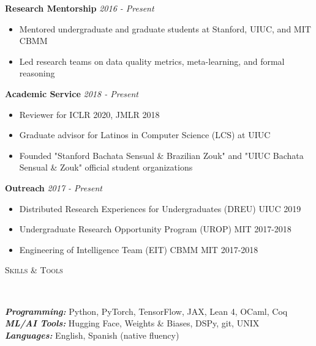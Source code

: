 \documentclass{article}
\newenvironment{changemargin}[2]{%
  \begin{list}{}{%
    \setlength{\topsep}{0pt}%
    \setlength{\leftmargin}{#1}%
    \setlength{\rightmargin}{#2}%
    \setlength{\listparindent}{\parindent}%
    \setlength{\itemindent}{\parindent}%
    \setlength{\parsep}{\parskip}%
  }%
  \item[]}{\end{list}
}
\newcommand{\lineover}{
	\begin{changemargin}{-0.05in}{-0.05in}
		\vspace*{-8pt}
		\hrulefill \\
		\vspace*{-2pt}
	\end{changemargin}
}
\newcommand{\header}[1]{
	\begin{changemargin}{-0.5in}{-0.5in}
		\scshape{#1}\\
  	\lineover
	\end{changemargin}
}
\newenvironment{body} {
	\vspace*{-16pt}
	\begin{changemargin}{-0.25in}{-0.5in}
  }	
	{\end{changemargin}
}
\begin{document}
\begin{body}
    \vspace{11pt}

\textbf{Research Mentorship} \hfill \emph{2016 - Present}\\
\vspace*{-3pt}
\begin{itemize} \itemsep -2pt
    \item Mentored undergraduate and graduate students at Stanford, UIUC, and MIT CBMM
    \item Led research teams on data quality metrics, meta-learning, and formal reasoning
\end{itemize}
\vspace{5 pt}

\textbf{Academic Service} \hfill \emph{2018 - Present}\\
\vspace*{-3pt}
\begin{itemize} \itemsep -2pt
    \item Reviewer for ICLR 2020, JMLR 2018
    \item Graduate advisor for Latinos in Computer Science (LCS) at UIUC
    \item Founded "Stanford Bachata Sensual \& Brazilian Zouk" and "UIUC Bachata Sensual \& Zouk" official student organizations
\end{itemize}
\vspace{5 pt}

\textbf{Outreach} \hfill \emph{2017 - Present}\\
\vspace*{-3pt}
\begin{itemize} \itemsep -2pt
    \item Distributed Research Experiences for Undergraduates (DREU) UIUC 2019
    \item Undergraduate Research Opportunity Program (UROP) MIT 2017-2018 
    \item Engineering of Intelligence Team (EIT) CBMM MIT 2017-2018
\end{itemize}

\end{body}


\header{Skills \& Tools}
\begin{body}
	\vspace{14pt}
	\emph{\textbf{Programming:}}{} Python, PyTorch, TensorFlow, JAX, Lean 4, OCaml, Coq\\
	\smallskip
	\emph{\textbf{ML/AI Tools:}}{}  Hugging Face, Weights \& Biases, DSPy, git, UNIX\\
	\smallskip
	\emph{\textbf{Languages:}}{} English, Spanish (native fluency)\\
\end{body}
\end{document}
